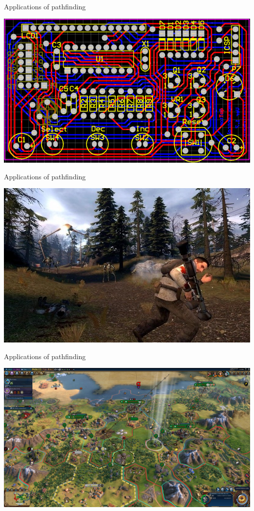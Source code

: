 \begin{frame}{Applications of pathfinding}
    \begin{center}
        \includegraphics[width=\textwidth]{pcb}
    \end{center}
\end{frame}

\begin{frame}{Applications of pathfinding}
    \begin{center}
        \includegraphics[width=\textwidth]{image5}
    \end{center}
\end{frame}

\begin{frame}{Applications of pathfinding}
    \begin{center}
        \includegraphics[width=\textwidth]{image6}
    \end{center}
\end{frame}

